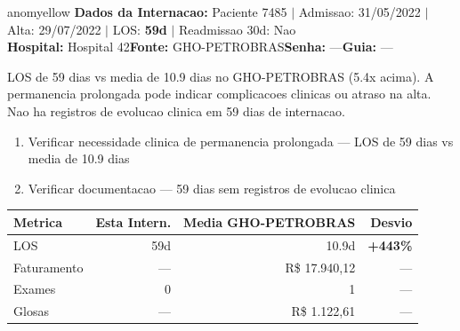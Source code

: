 \documentclass[a4paper,10pt]{article}
\begin{document}
\begin{anomalycard}[Internacao 7431 | GHO-PETROBRAS | MODERADO (z=2.06)]{anomyellow}
\textbf{Dados da Internacao:} Paciente 7485 $\mid$ Admissao: 31/05/2022 $\mid$ Alta: 29/07/2022 $\mid$ LOS: \textbf{59d} $\mid$ Readmissao 30d: Nao\\
\textbf{Hospital:} Hospital 42\quad\textbf{Fonte:} GHO-PETROBRAS\quad\textbf{Senha:} ---\quad\textbf{Guia:} ---\\
\vspace{2pt}\begin{tcolorbox}[colback=severityred!20,colframe=anomyellow,title={\textbf{Interpretacao de Negocio}},fonttitle=\bfseries\small,left=4pt,right=4pt,top=3pt,bottom=3pt]
{\small LOS de 59 dias vs media de 10.9 dias no GHO-PETROBRAS (5.4x acima). A permanencia prolongada pode indicar complicacoes clinicas ou atraso na alta. Nao ha registros de evolucao clinica em 59 dias de internacao.}
\end{tcolorbox}
\begin{tcolorbox}[colback=severityyellow!30,colframe=anomorange,title={\textbf{Recomendacoes Especificas}},fonttitle=\bfseries\small,left=4pt,right=4pt,top=3pt,bottom=3pt]
\begin{enumerate}[nosep,leftmargin=16pt]
\item {\small Verificar necessidade clinica de permanencia prolongada --- LOS de 59 dias vs media de 10.9 dias}
\item {\small Verificar documentacao --- 59 dias sem registros de evolucao clinica}
\end{enumerate}
\end{tcolorbox}
\begin{center}\begin{tabular}{l r r r}\toprule\textbf{Metrica} & \textbf{Esta Intern.} & \textbf{Media GHO-PETROBRAS} & \textbf{Desvio} \\\midrule
LOS & 59d & 10.9d & \textcolor{anomred}{\textbf{+443\%}} \\
Faturamento & --- & R\$ 17.940,12 & --- \\
Exames & 0 & 1 & --- \\
Glosas & --- & R\$ 1.122,61 & --- \\
\bottomrule\end{tabular}\end{center}


\end{anomalycard}
\end{document}
